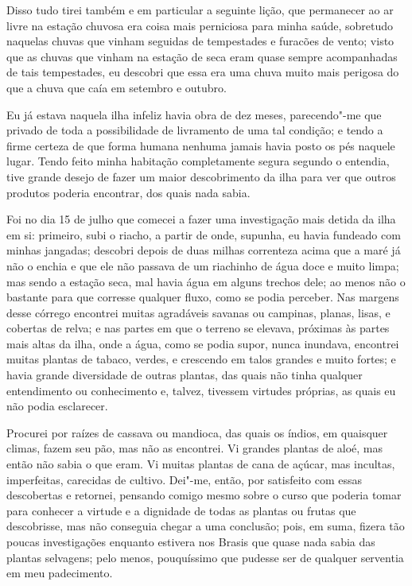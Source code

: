 Disso tudo tirei também e em particular a seguinte lição, que permanecer
ao ar livre na estação chuvosa era coisa mais perniciosa para minha
saúde, sobretudo naquelas chuvas que vinham seguidas de tempestades e
furacões de vento; visto que as chuvas que vinham na estação de seca
eram quase sempre acompanhadas de tais tempestades, eu descobri que essa
era uma chuva muito mais perigosa do que a chuva que caía em setembro e
outubro.

Eu já estava naquela ilha infeliz havia obra de dez meses, parecendo"-me
que privado de toda a possibilidade de livramento de uma tal condição; e
tendo a firme certeza de que forma humana nenhuma jamais havia posto os
pés naquele lugar. Tendo feito minha habitação completamente segura
segundo o entendia, tive grande desejo de fazer um maior descobrimento
da ilha para ver que outros produtos poderia encontrar, dos quais nada
sabia.

Foi no dia 15 de julho que comecei a fazer uma investigação mais detida
da ilha em si: primeiro, subi o riacho, a partir de onde, supunha, eu
havia fundeado com minhas jangadas; descobri depois de duas milhas
correnteza acima que a maré já não o enchia e que ele não passava de um
riachinho de água doce e muito limpa; mas sendo a estação seca, mal
havia água em alguns trechos dele; ao menos não o bastante para que
corresse qualquer fluxo, como se podia perceber. Nas margens desse
córrego encontrei muitas agradáveis savanas ou campinas, planas, lisas,
e cobertas de relva; e nas partes em que o terreno se elevava, próximas
às partes mais altas da ilha, onde a água, como se podia supor, nunca
inundava, encontrei muitas plantas de tabaco, verdes, e crescendo em
talos grandes e muito fortes; e havia grande diversidade de outras
plantas, das quais não tinha qualquer entendimento ou conhecimento e,
talvez, tivessem virtudes próprias, as quais eu não podia esclarecer.

Procurei por raízes de cassava ou mandioca, das quais os índios, em
quaisquer climas, fazem seu pão, mas não as encontrei. Vi grandes
plantas de aloé, mas então não sabia o que eram. Vi muitas plantas de
cana de açúcar, mas incultas, imperfeitas, carecidas de cultivo. Dei"-me,
então, por satisfeito com essas descobertas e retornei, pensando comigo
mesmo sobre o curso que poderia tomar para conhecer a virtude e a
dignidade de todas as plantas ou frutas que descobrisse, mas não
conseguia chegar a uma conclusão; pois, em suma, fizera tão poucas
investigações enquanto estivera nos Brasis que quase nada sabia das
plantas selvagens; pelo menos, pouquíssimo que pudesse ser de qualquer
serventia em meu padecimento.

